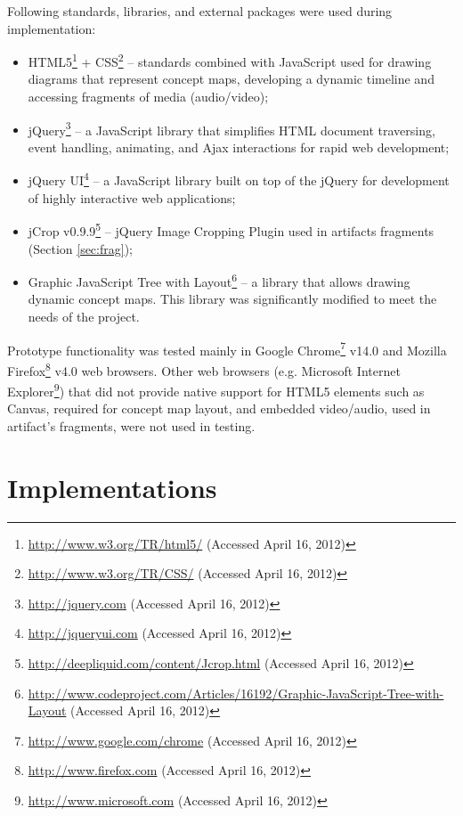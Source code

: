Following standards, libraries, and external packages were used during
implementation:

\begin{itemize}

\item HTML5\footnote{\url{http://www.w3.org/TR/html5/} (Accessed April 16,
2012)} + CSS\footnote{\url{http://www.w3.org/TR/CSS/} (Accessed April 16, 2012)}
-- standards combined with JavaScript used for drawing diagrams that represent concept maps, developing a
dynamic timeline and accessing fragments of media (audio/video);

\item jQuery\footnote{\url{http://jquery.com} (Accessed April 16, 2012)} -- a
JavaScript library that simplifies HTML document traversing, event handling, animating, and Ajax
interactions for rapid web development;

\item jQuery UI\footnote{\url{http://jqueryui.com} (Accessed April 16, 2012)} --
a JavaScript library built on top of the jQuery for development of highly interactive web applications;

\item jCrop v0.9.9\footnote{\url{http://deepliquid.com/content/Jcrop.html}
(Accessed April 16, 2012)} -- jQuery Image Cropping Plugin used in artifacts fragments (Section
\ref{sec:frag});

\item Graphic JavaScript Tree with
Layout\footnote{\url{http://www.codeproject.com/Articles/16192/Graphic-JavaScript-Tree-with-Layout}
(Accessed April 16, 2012)} -- a library that allows drawing dynamic concept maps. This library was
significantly modified to meet the needs of the project.
\end{itemize}

Prototype functionality was tested mainly in Google
Chrome\footnote{\url{http://www.google.com/chrome} (Accessed April 16, 2012)}
v14.0 and Mozilla Firefox\footnote{\url{http://www.firefox.com} (Accessed April
16, 2012)} v4.0 web browsers. Other web browsers (e.g. Microsoft Internet
Explorer\footnote{\url{http://www.microsoft.com} (Accessed April 16, 2012)})
that did not provide native support for HTML5 elements such as Canvas, required for concept map layout, and
embedded video/audio, used in artifact's fragments, were not used in testing.

\section{Implementations}

